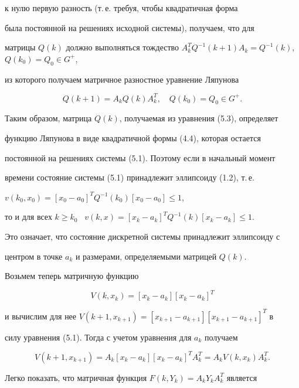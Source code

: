 к нулю первую разность (т.\,е. требуя, чтобы квадратичная форма


была постоянной на решениях исходной системы), получаем, что для


матрицы $Q(k)$ должно выполняться тождество $A^T_k Q^{-1}(k+1)A_k=Q^{-1}


(k)$, $Q(k_0)=Q_0\in G^+$,


из которого получаем матричное разностное уравнение Ляпунова


\begin{equation}


Q(k+1)=A_k Q(k)A^T_k,\quad Q(k_0)=Q_0\in G^+.


\end{equation}





Таким образом, матрица $Q(k)$, получаемая из уравнения (5.3), определяет


функцию Ляпунова в виде квадратичной формы (4.4), которая остается


постоянной на решениях системы (5.1). Поэтому если в начальный момент


времени состояние системы (5.1) принадлежит эллипсоиду (1.2), т.\,е.


$v(k_0,x_0)=[x_0-a_0]^T Q^{-1}(k_0)[x_0-a_0]\le1$,


то и для всех $k\ge k_0$ \ $v(k,x)=[x_k-a_k]^T Q^{-1}(k)[x_k-a_k]\le1$.


Это означает, что состояние дискретной системы принадлежит эллипсоиду с


центром в точке $a_k$ и размерами, определяемыми матрицей $Q(k)$.





Возьмем теперь матричную функцию


\begin{equation}


V(k,x_k)=[x_k-a_k][x_k-a_k]^T


\end{equation}


и вычислим для нее $V(k+1,x_{k+1})=[x_{k+1}-a_{k+1}][x_{k+1}-a_{k+1}]^T$ в


силу уравнения (5.1). Тогда с учетом уравнения для $a_k$ получаем


$$


V(k+1,x_{k+1})=A_k[x_k-a_k][x_k-a_k]^T A^T_k=A_k V(k,x_k)A^T_k.


$$


Легко показать, что матричная функция $F(k,Y_k)=A_k Y_k A^T_k$ является


